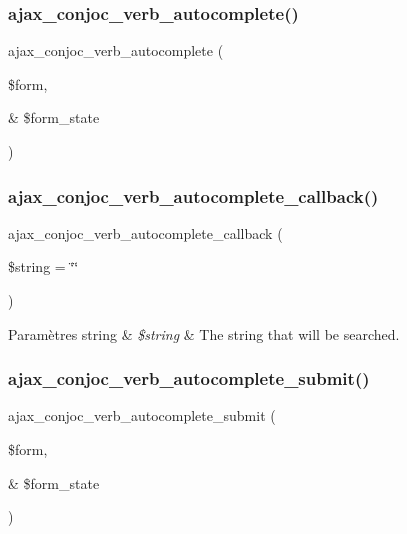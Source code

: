 \subsubsection{\texorpdfstring{ajax\+\_\+conjoc\+\_\+verb\+\_\+autocomplete()}{ajax\_conjoc\_verb\_autocomplete()}}
{\footnotesize\ttfamily ajax\+\_\+conjoc\+\_\+verb\+\_\+autocomplete (\begin{DoxyParamCaption}\item[{}]{\$form,  }\item[{\&}]{\$form\+\_\+state }\end{DoxyParamCaption})}

\hypertarget{conjoc__web_form_8inc_a5ea54e98ecadf55b7fe917fe6237a52e}{}\label{conjoc__web_form_8inc_a5ea54e98ecadf55b7fe917fe6237a52e} 
\subsubsection{\texorpdfstring{ajax\+\_\+conjoc\+\_\+verb\+\_\+autocomplete\+\_\+callback()}{ajax\_conjoc\_verb\_autocomplete\_callback()}}
{\footnotesize\ttfamily ajax\+\_\+conjoc\+\_\+verb\+\_\+autocomplete\+\_\+callback (\begin{DoxyParamCaption}\item[{}]{\$string = {\ttfamily \char`\"{}\char`\"{}} }\end{DoxyParamCaption})}


\begin{DoxyParams}[1]{Paramètres}
string & {\em \$string} & The string that will be searched. \\
\hline
\end{DoxyParams}
\hypertarget{conjoc__web_form_8inc_add934c4187ded056db9c8369764a51ed}{}\label{conjoc__web_form_8inc_add934c4187ded056db9c8369764a51ed} 
\subsubsection{\texorpdfstring{ajax\+\_\+conjoc\+\_\+verb\+\_\+autocomplete\+\_\+submit()}{ajax\_conjoc\_verb\_autocomplete\_submit()}}
{\footnotesize\ttfamily ajax\+\_\+conjoc\+\_\+verb\+\_\+autocomplete\+\_\+submit (\begin{DoxyParamCaption}\item[{}]{\$form,  }\item[{\&}]{\$form\+\_\+state }\end{DoxyParamCaption})}

